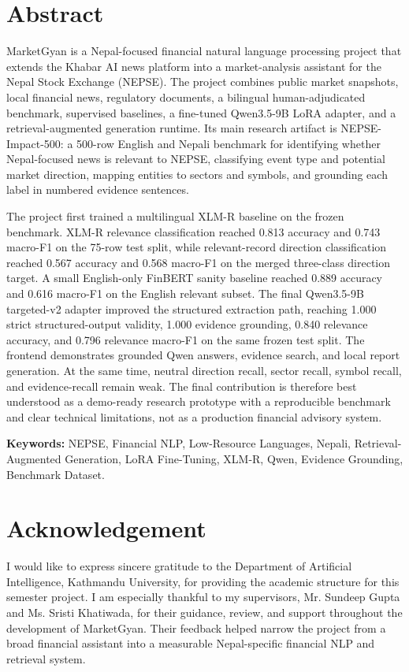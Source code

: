 \documentclass[12pt,a4paper]{report}
\newcommand{\supervisorone}{Mr. Sundeep Gupta}
\newcommand{\supervisortwo}{Ms. Sristi Khatiwada}
\begin{document}

\chapter*{Abstract}
MarketGyan is a Nepal-focused financial natural language processing project that extends the Khabar AI news platform into a market-analysis assistant for the Nepal Stock Exchange (NEPSE). The project combines public market snapshots, local financial news, regulatory documents, a bilingual human-adjudicated benchmark, supervised baselines, a fine-tuned Qwen3.5-9B LoRA adapter, and a retrieval-augmented generation runtime. Its main research artifact is NEPSE-Impact-500: a 500-row English and Nepali benchmark for identifying whether Nepal-focused news is relevant to NEPSE, classifying event type and potential market direction, mapping entities to sectors and symbols, and grounding each label in numbered evidence sentences.

The project first trained a multilingual XLM-R baseline on the frozen benchmark. XLM-R relevance classification reached 0.813 accuracy and 0.743 macro-F1 on the 75-row test split, while relevant-record direction classification reached 0.567 accuracy and 0.568 macro-F1 on the merged three-class direction target. A small English-only FinBERT sanity baseline reached 0.889 accuracy and 0.616 macro-F1 on the English relevant subset. The final Qwen3.5-9B targeted-v2 adapter improved the structured extraction path, reaching 1.000 strict structured-output validity, 1.000 evidence grounding, 0.840 relevance accuracy, and 0.796 relevance macro-F1 on the same frozen test split. The frontend demonstrates grounded Qwen answers, evidence search, and local report generation. At the same time, neutral direction recall, sector recall, symbol recall, and evidence-recall remain weak. The final contribution is therefore best understood as a demo-ready research prototype with a reproducible benchmark and clear technical limitations, not as a production financial advisory system.

\vspace{6pt}
\noindent\textbf{Keywords:} NEPSE, Financial NLP, Low-Resource Languages, Nepali, Retrieval-Augmented Generation, LoRA Fine-Tuning, XLM-R, Qwen, Evidence Grounding, Benchmark Dataset.

\chapter*{Acknowledgement}
I would like to express sincere gratitude to the Department of Artificial Intelligence, Kathmandu University, for providing the academic structure for this semester project. I am especially thankful to my supervisors, \supervisorone{} and \supervisortwo{}, for their guidance, review, and support throughout the development of MarketGyan. Their feedback helped narrow the project from a broad financial assistant into a measurable Nepal-specific financial NLP and retrieval system.
\end{document}
